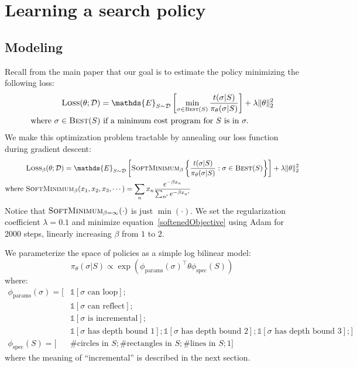\documentclass{article}
\newcommand{\indicator}{\mathds{1}} %
\newcommand{\expect}{\mathds{E}} %
\begin{document}
\section{Learning a search policy}
\subsection{Modeling}\label{searchPolicyModel}
Recall from the main paper that our goal is to estimate the policy minimizing the following loss:
\begin{align}
\textsc{Loss}(\theta ; \mathcal{D})& =  \expect_{S\sim\mathcal{D}}\left[ \min_{\sigma\in \text{\textsc{Best}}(S)}\frac{t(\sigma | S)}{\pi_\theta (\sigma | S)}\right] + \lambda \Vert\theta\Vert_2^2\label{policyLoss}\\
\text{where }  \sigma \in\text{\textsc{Best}}(S) &\text{ if  a minimum cost program for }S \text{ is in }\sigma .\nonumber %
\end{align}
We make this optimization problem tractable by annealing our loss function during gradient descent:
\begin{align}
&  \textsc{Loss}_\beta(\theta ; \mathcal{D}) =  \expect_{S\sim\mathcal{D}}\left[ \textsc{SoftMinimum}_\beta \left\{
    \frac{t(\sigma | S)}{\pi_\theta (\sigma | S)}    : \sigma\in \text{\textsc{Best}}(S)\right\}\right] + \lambda \Vert\theta\Vert_2^2\label{softenedObjective}\\
  \text{where }&\textsc{SoftMinimum}_\beta (x_1,x_2,x_3,\cdots ) = \sum_n x_n  \frac{e^{-\beta x_n}}{\sum_{n'}e^{-\beta x_{n'}}}
\end{align}
Notice that $\textsc{SoftMinimum}_{\beta = \infty}(\cdot )$ is just $\min(\cdot )$.
We set the regularization coefficient $\lambda = 0.1$ and minimize equation~\ref{softenedObjective}
using Adam for 2000 steps, linearly increasing $\beta$ from $1$ to $2$.

We parameterize the space of policies as a simple log bilinear model:
\begin{equation}
  \pi_{\theta}(\sigma |S)\propto \exp \left( \phi_{\text{params}}(\sigma )^\top\theta \phi_{\text{spec}}(S)\right)
\end{equation}
where:
\begin{align*}
  \phi_{\text{params}}(\sigma ) = [&\indicator [\sigma \text{ can loop}] ;\\
    &\indicator [\sigma \text{ can reflect}];\\
    &\indicator [\sigma \text{ is incremental}] ; \\
    &\indicator [\sigma \text{ has depth bound }1];\indicator [\sigma \text{ has depth bound }2];\indicator [\sigma \text{ has depth bound }3];]\\
  \phi_{\text{spec}}(S) = [&\text{\# circles in }S;\text{\# rectangles in }S;\text{\# lines in }S;1]
  \end{align*}
where the meaning of ``incremental'' is described in the next section.
\end{document}
